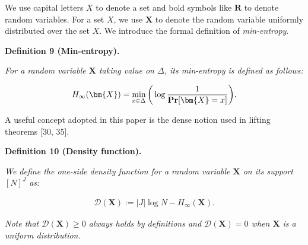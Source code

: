 \documentclass[10pt,a4paper]{article}
\begin{document}
We use capital letters $X$ to denote a set and bold symbols like $\bm{R}$ to denote random variables. For a set $X$, we use $\bm{X}$ to denote the random variable uniformly distributed over the set $X$. We introduce the formal definition of \emph{min-entropy}.\par





\par\medskip\noindent\textbf{
\textbf{Definition 9}\textbf{ }(Min-entropy)\textbf{.}
}\par



\emph{For a random variable $\bm{X}$ taking value on $\Delta$, its min-entropy is defined as follows:}\par


\[\begin{gathered}
H_{\infty}(\bm{X})=\mathop{\min}_{x\in\Delta}\bigg{(}\log\frac{1}{\operatorname*{\mathbf{Pr}}[\bm{X}=x]}\bigg{)}.
\end{gathered}\]






A useful concept adopted in this paper is the dense notion used in lifting theorems [30, 35].\par





\par\medskip\noindent\textbf{
\textbf{Definition 10}\textbf{ }(Density function)\textbf{.}
}\par



\emph{We define the one-side density function for a random variable $\bm{X}$ on its support $[N]^{J}$ as:}\par


\[\begin{gathered}
\mathcal{D}(\bm{X}):=|J|\log N-H_{\infty}(\bm{X}).
\end{gathered}\]


\emph{Note that $\mathcal{D}(\bm{X})\geq 0$ always holds by definitions and $\mathcal{D}(\bm{X})=0$ when $\bm{X}$ is a uniform distribution.}\par



\end{document}
